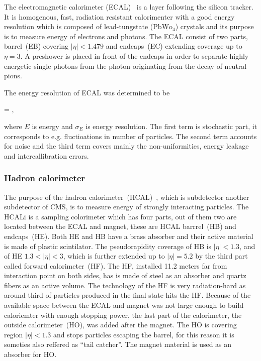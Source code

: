 The electromagnetic calorimeter (ECAL)~\cite{tdrECAL} is a layer following the silicon tracker. It is homogenous, fast, radiation resistant calorimenter with a good energy resolution which is composed of lead-tungstate ($\mathrm{PbWo_{4}}$) crystals and its purpose is to measure energy of electrons and photons. The ECAL consist of two parts, barrel~(EB) covering $|\eta|<1.479$ and endcaps~(EC) extending coverage up to $\eta =3$. A preshower is placed in front of the endcaps in order to separate highly energetic single photons from the photon originating from the decay of neutral pions.

The energy resolution of ECAL was determined to be

{
  =  \bigoplus {}  ,
}

where $E$ is energy and $\sigma_{E}$ is energy resolution. The first term is stochastic part, it corresponds to e.g. fluctioations in number of particles. The second term accounts for noise and the third term covers mainly the non-uniformities, energy leakage and intercallibration errors.


\subsubsection{Hadron calorimeter}

The purpose of the hadron calorimeter~(HCAL)~\cite{tdrHCAL}, which is subdetector another subdetector of CMS, is to measure energy of strongly interacting particles.  The HCALi is a sampling colorimeter which has four parts, out of them two are located between the ECAL and magnet, these are HCAL barrrel~(HB) and endcaps~(HE). Both HE and HB have a brass absorber and their active material is made of plastic scintilator. The pseudorapidity coverage of HB is $|\eta|<1.3$, and of HE $1.3<|\eta|<3$, which is further extended up to $|\eta|=5.2$ by the third part called forward calorimeter~(HF). The HF, installed 11.2 meters far from interaction point on both sides, has is made of steel as an absorber and quartz fibers as an active volume. The technology of the HF is very radiation-hard as around third of particles produced in the final state hits the HF. Because of the available space between the ECAL and magnet was not large enough to build caloriemter with enough stopping power, the last part of the calorimeter, the outside calorimeter~(HO), was added after the magnet. The HO is covering region $|\eta|<1.3$ and stops particles escaping the barrel, for this reason it is someties also reffered as ``tail catcher''. The magnet material is used as an absorber for HO.

